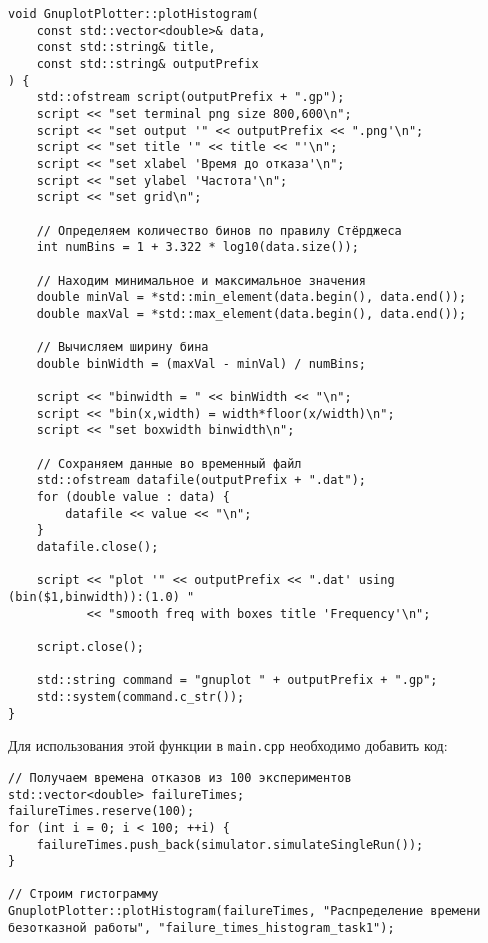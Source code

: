 \begin{verbatim}
void GnuplotPlotter::plotHistogram(
    const std::vector<double>& data,
    const std::string& title,
    const std::string& outputPrefix
) {
    std::ofstream script(outputPrefix + ".gp");
    script << "set terminal png size 800,600\n";
    script << "set output '" << outputPrefix << ".png'\n";
    script << "set title '" << title << "'\n";
    script << "set xlabel 'Время до отказа'\n";
    script << "set ylabel 'Частота'\n";
    script << "set grid\n";

    // Определяем количество бинов по правилу Стёрджеса
    int numBins = 1 + 3.322 * log10(data.size());

    // Находим минимальное и максимальное значения
    double minVal = *std::min_element(data.begin(), data.end());
    double maxVal = *std::max_element(data.begin(), data.end());

    // Вычисляем ширину бина
    double binWidth = (maxVal - minVal) / numBins;

    script << "binwidth = " << binWidth << "\n";
    script << "bin(x,width) = width*floor(x/width)\n";
    script << "set boxwidth binwidth\n";

    // Сохраняем данные во временный файл
    std::ofstream datafile(outputPrefix + ".dat");
    for (double value : data) {
        datafile << value << "\n";
    }
    datafile.close();

    script << "plot '" << outputPrefix << ".dat' using (bin($1,binwidth)):(1.0) "
           << "smooth freq with boxes title 'Frequency'\n";

    script.close();

    std::string command = "gnuplot " + outputPrefix + ".gp";
    std::system(command.c_str());
}
\end{verbatim}

Для использования этой функции в \texttt{main.cpp} необходимо добавить код:

\begin{verbatim}
// Получаем времена отказов из 100 экспериментов
std::vector<double> failureTimes;
failureTimes.reserve(100);
for (int i = 0; i < 100; ++i) {
    failureTimes.push_back(simulator.simulateSingleRun());
}

// Строим гистограмму
GnuplotPlotter::plotHistogram(failureTimes, "Распределение времени безотказной работы", "failure_times_histogram_task1");
\end{verbatim}

\newpage
